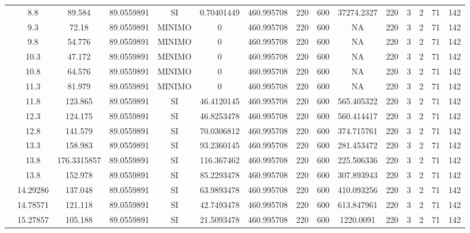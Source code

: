 \begin{table}[H]
{\begin{tabular}{|c|c|c|c|c|c|c|c|c|c|c|c|c|c|c|}
\cline{2-15}    & 8.8 & 89.584 & 89.0559891 & SI  & 0.70401449 & 460.995708 & 220 & 600 & 37274.2327 & 220 & 3   & 2   & 71  & 142 \bigstrut\\
\cline{2-15}    & 9.3 & 72.18 & 89.0559891 & MINIMO & 0   & 460.995708 & 220 & 600 & NA  & 220 & 3   & 2   & 71  & 142 \bigstrut\\
\cline{2-15}    & 9.8 & 54.776 & 89.0559891 & MINIMO & 0   & 460.995708 & 220 & 600 & NA  & 220 & 3   & 2   & 71  & 142 \bigstrut\\
\cline{2-15}    & 10.3 & 47.172 & 89.0559891 & MINIMO & 0   & 460.995708 & 220 & 600 & NA  & 220 & 3   & 2   & 71  & 142 \bigstrut\\
\cline{2-15}    & 10.8 & 64.576 & 89.0559891 & MINIMO & 0   & 460.995708 & 220 & 600 & NA  & 220 & 3   & 2   & 71  & 142 \bigstrut\\
\cline{2-15}    & 11.3 & 81.979 & 89.0559891 & MINIMO & 0   & 460.995708 & 220 & 600 & NA  & 220 & 3   & 2   & 71  & 142 \bigstrut\\
\cline{2-15}    & 11.8 & 123.865 & 89.0559891 & SI  & 46.4120145 & 460.995708 & 220 & 600 & 565.405322 & 220 & 3   & 2   & 71  & 142 \bigstrut\\
\cline{2-15}    & 12.3 & 124.175 & 89.0559891 & SI  & 46.8253478 & 460.995708 & 220 & 600 & 560.414417 & 220 & 3   & 2   & 71  & 142 \bigstrut\\
\cline{2-15}    & 12.8 & 141.579 & 89.0559891 & SI  & 70.0306812 & 460.995708 & 220 & 600 & 374.715761 & 220 & 3   & 2   & 71  & 142 \bigstrut\\
\cline{2-15}    & 13.3 & 158.983 & 89.0559891 & SI  & 93.2360145 & 460.995708 & 220 & 600 & 281.453472 & 220 & 3   & 2   & 71  & 142 \bigstrut\\
\cline{2-15}    & 13.8 & 176.3315857 & 89.0559891 & SI  & 116.367462 & 460.995708 & 220 & 600 & 225.506336 & 220 & 3   & 2   & 71  & 142 \bigstrut\\
\cline{2-15}    & 13.8 & 152.978 & 89.0559891 & SI  & 85.2293478 & 460.995708 & 220 & 600 & 307.893943 & 220 & 3   & 2   & 71  & 142 \bigstrut\\
\cline{2-15}    & 14.29286 & 137.048 & 89.0559891 & SI  & 63.9893478 & 460.995708 & 220 & 600 & 410.093256 & 220 & 3   & 2   & 71  & 142 \bigstrut\\
\cline{2-15}    & 14.78571 & 121.118 & 89.0559891 & SI  & 42.7493478 & 460.995708 & 220 & 600 & 613.847961 & 220 & 3   & 2   & 71  & 142 \bigstrut\\
\cline{2-15}    & 15.27857 & 105.188 & 89.0559891 & SI  & 21.5093478 & 460.995708 & 220 & 600 & 1220.0091 & 220 & 3   & 2   & 71  & 142 \bigstrut\\

\end{tabular}}
\end{table}

